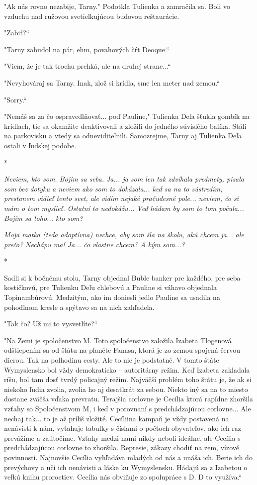 \documentclass{book}
\begin{document}
"$ $Ak nás rovno nezabije, Tarny."$ $ Podotkla Tulienka a zamračila sa. Boli vo vzduchu nad ružovou svetielkujúcou budovou reštaurácie.

"Zabiť?“

"Tarny zabudol na pár, ehm, povahových čŕt Deoque.“

"Viem, že je tak trochu prchká, ale na druhej strane...“

"Nevyhováraj sa Tarny. Inak, zlož si krídla, sme len meter nad zemou.“

"Sorry.“

"Nemáš sa za čo ospravedlňovať... poď Pauline,"$ $ Tulienka Deľa šťukla gombík na krídlach, tie sa okamžite deaktivovali a zložili do jedného súvislého balíka. Stáli na parkovisku a vtedy sa odneviditeľnili. Samozrejme, Tarny aj Tulienka Deľa ostali v ľudskej podobe.

\begin{center}
*
\end{center}

\textit{Neviem, kto som. Bojím sa seba. Ja... ja som len tak zdvíhala predmety, písala som bez dotyku a neviem ako som to dokázala... keď sa na to sústredím, prestanem vidieť tento svet, ale vidím nejaké pračudesné pole... neviem, čo si mám o tom myslieť. Ostatní to nedokážu... Veď hádam by som to tom počula... Bojím sa toho... kto som?}

\textit{Moja matka (teda adoptívna) nechce, aby som šla na školu, akú chcem ja... ale prečo? Nechápu ma! Ja... čo vlastne chcem? A kým som...?}

\begin{center}
*
\end{center}

Sadli si k bočnému stolu, Tarny objednal Buble banker pre každého, pre seba kostičkovú, pre Tulienku Deľu chlebovú a Pauline si váhavo objednala Topinambúrovú. Medzitým, ako im doniesli jedlo Pauline sa usadila na pohodlnom kresle a spýtavo sa na nich zahľadela.

"Tak čo? Už mi to vysvetlíte?“

"Na Zemi je spoločenstvo M. Toto spoločenstvo založila Izabeta Tlogenová odštiepením sa od štátu na planéte Fanasa, ktorá je zo zemou spojená červou dierou. Tak na polhodinu cesty. Ale to nie je podstatné. V tomto štáte Wymyslensko bol vždy demokraticko – autoritárny režim. Keď Izabeta zakladala ríšu, bol tam dosť tvrdý policajný režim. Najväčší problém toho štátu je, že ak si niekoho ľudia zvolia, zvolia ho aj desaťkrát za sebou. Niekto iný sa na to miesto dostane zväčša vďaka prevratu. Terajšia corlovne je Cecília ktorá rapídne zhoršila vzťahy so Spoločenstvom M, i keď v porovnaní s predchádzajúcou corlovne... Ale nechaj tak... to je až príliš zložité. Cecíliina kampaň je vždy postavená na nenávisti k nám, vyťahuje tabuľky s číslami o počtoch obyvateľov, ako ich raz prevážime a zaútočíme. Vzťahy medzi nami nikdy neboli ideálne, ale Cecília s predchádzajúcou corlovne to zhoršila. Represie, zákazy chodiť na zem, vízové povinnosti. Najnovšie Cecília vyhľadáva mladých od nás a unáša ich. Berie ich do prevýchovy a učí ich nenávisti a láske ku Wymyslensku. Hádajú sa z Izabetou o veľkú knihu proroctiev. Cecília nás obviňuje zo spolupráce s D. D to využíva.“
\end{document}
